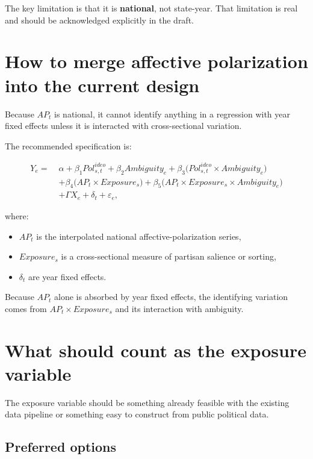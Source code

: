 \documentclass[12pt]{article}
\begin{document}
The key limitation is that it is \textbf{national}, not state-year. That limitation is real and should be acknowledged explicitly in the draft.

\section{How to merge affective polarization into the current design}

Because $AP_t$ is national, it cannot identify anything in a regression with year fixed effects unless it is interacted with cross-sectional variation.

The recommended specification is:

\begin{equation}
\begin{aligned}
Y_e =\; &\alpha + \beta_1 Pol^{ideo}_{s,t} + \beta_2 Ambiguity_e + \beta_3\big(Pol^{ideo}_{s,t}\times Ambiguity_e\big) \\
&+ \beta_4\big(AP_t \times Exposure_s\big) + \beta_5\big(AP_t \times Exposure_s \times Ambiguity_e\big) \\
&+ \Gamma X_e + \delta_t + \varepsilon_e,
\end{aligned}
\end{equation}

where:
\begin{itemize}[leftmargin=1.5em]
    \item $AP_t$ is the interpolated national affective-polarization series,
    \item $Exposure_s$ is a cross-sectional measure of partisan salience or sorting,
    \item $\delta_t$ are year fixed effects.
\end{itemize}

Because $AP_t$ alone is absorbed by year fixed effects, the identifying variation comes from $AP_t \times Exposure_s$ and its interaction with ambiguity.

\section{What should count as the exposure variable}

The exposure variable should be something already feasible with the existing data pipeline or something easy to construct from public political data.

\subsection{Preferred options}
\end{document}
